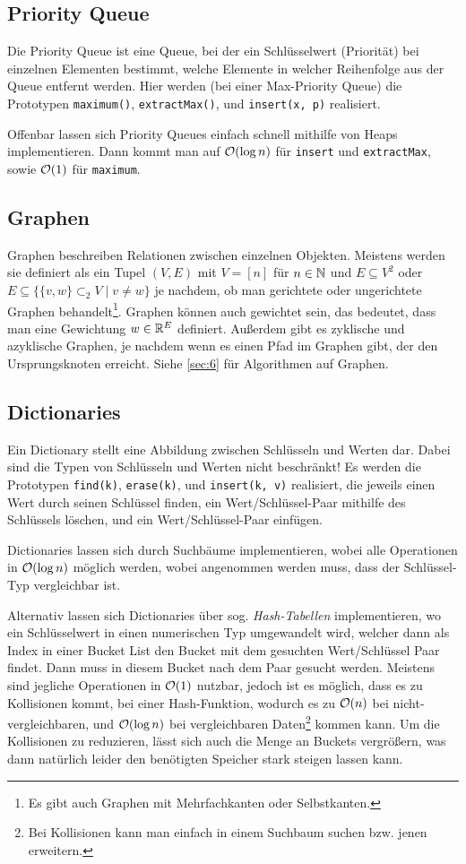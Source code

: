 \subsection{Priority Queue}
Die Priority Queue ist eine Queue, bei der ein Schlüsselwert (Priorität) bei einzelnen Elementen bestimmt, welche Elemente in welcher Reihenfolge aus der Queue entfernt werden.
Hier werden (bei einer Max-Priority Queue) die Prototypen \lstinline|maximum()|, \lstinline|extractMax()|, und \lstinline|insert(x, p)| realisiert.

Offenbar lassen sich Priority Queues einfach schnell mithilfe von Heaps implementieren.
Dann kommt man auf \(\mathcal O(\log n)\) für \lstinline|insert| und \lstinline|extractMax|, sowie \(\mathcal O(1)\) für \lstinline|maximum|.

\subsection{Graphen}
Graphen beschreiben Relationen zwischen einzelnen Objekten.
Meistens werden sie definiert als ein Tupel \((V, E)\) mit \(V = [n]\) für \(n \in \mathbb N\) und \(E \subseteq V^2\) oder \(E \subseteq \{\{v, w\} \subset_2 V \mid v \ne w\}\) je nachdem, ob man gerichtete oder ungerichtete Graphen behandelt\footnote{Es gibt auch Graphen mit Mehrfachkanten oder Selbstkanten.}.
Graphen können auch gewichtet sein, das bedeutet, dass man eine Gewichtung \(w \in \mathbb R^E\) definiert.
Außerdem gibt es zyklische und azyklische Graphen, je nachdem wenn es einen Pfad im Graphen gibt, der den Ursprungsknoten erreicht.
Siehe \autoref{sec:6} für Algorithmen auf Graphen.

\subsection{Dictionaries}
Ein Dictionary stellt eine Abbildung zwischen Schlüsseln und Werten dar.
Dabei sind die Typen von Schlüsseln und Werten nicht beschränkt!
Es werden die Prototypen \lstinline|find(k)|, \lstinline|erase(k)|, und \lstinline|insert(k, v)| realisiert, die jeweils einen Wert durch seinen Schlüssel finden, ein Wert/Schlüssel-Paar mithilfe des Schlüssels löschen, und ein Wert/Schlüssel-Paar einfügen.

Dictionaries lassen sich durch Suchbäume implementieren, wobei alle Operationen in \(\mathcal O(\log n)\) möglich werden, wobei angenommen werden muss, dass der Schlüssel-Typ vergleichbar ist.

Alternativ lassen sich Dictionaries über sog. \emph{Hash-Tabellen} implementieren, wo ein Schlüsselwert in einen numerischen Typ umgewandelt wird, welcher dann als Index in einer Bucket List den Bucket mit dem gesuchten Wert/Schlüssel Paar findet.
Dann muss in diesem Bucket nach dem Paar gesucht werden.
Meistens sind jegliche Operationen in \(\mathcal O(1)\) nutzbar, jedoch ist es möglich, dass es zu Kollisionen kommt, bei einer Hash-Funktion, wodurch es zu \(\mathcal O(n)\) bei nicht-vergleichbaren, und \(\mathcal O(\log n)\) bei vergleichbaren Daten\footnote{Bei Kollisionen kann man einfach in einem Suchbaum suchen bzw. jenen erweitern.} kommen kann.
Um die Kollisionen zu reduzieren, lässt sich auch die Menge an Buckets vergrößern, was dann natürlich leider den benötigten Speicher stark steigen lassen kann.

